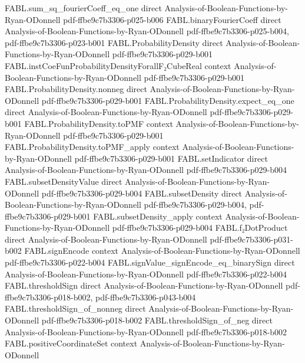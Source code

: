 \begin{theorem}
\proofstep
  {FABL.sum_sq_fourierCoeff_eq_one}
  {direct}
  {Analysis-of-Boolean-Functions-by-Ryan-ODonnell}
  {pdf-ffbe9c7b3306-p025-b006}
\proofstep
  {FABL.binaryFourierCoeff}
  {direct}
  {Analysis-of-Boolean-Functions-by-Ryan-ODonnell}
  {pdf-ffbe9c7b3306-p025-b004,
    pdf-ffbe9c7b3306-p023-b001}
\proofstep
  {FABL.ProbabilityDensity}
  {direct}
  {Analysis-of-Boolean-Functions-by-Ryan-ODonnell}
  {pdf-ffbe9c7b3306-p029-b001}
\proofstep
  {FABL.instCoeFunProbabilityDensityForallF₂CubeReal}
  {context}
  {Analysis-of-Boolean-Functions-by-Ryan-ODonnell}
  {pdf-ffbe9c7b3306-p029-b001}
\proofstep
  {FABL.ProbabilityDensity.nonneg}
  {direct}
  {Analysis-of-Boolean-Functions-by-Ryan-ODonnell}
  {pdf-ffbe9c7b3306-p029-b001}
\proofstep
  {FABL.ProbabilityDensity.expect_eq_one}
  {direct}
  {Analysis-of-Boolean-Functions-by-Ryan-ODonnell}
  {pdf-ffbe9c7b3306-p029-b001}
\proofstep
  {FABL.ProbabilityDensity.toPMF}
  {context}
  {Analysis-of-Boolean-Functions-by-Ryan-ODonnell}
  {pdf-ffbe9c7b3306-p029-b001}
\proofstep
  {FABL.ProbabilityDensity.toPMF_apply}
  {context}
  {Analysis-of-Boolean-Functions-by-Ryan-ODonnell}
  {pdf-ffbe9c7b3306-p029-b001}
\proofstep
  {FABL.setIndicator}
  {direct}
  {Analysis-of-Boolean-Functions-by-Ryan-ODonnell}
  {pdf-ffbe9c7b3306-p029-b004}
\proofstep
  {FABL.subsetDensityValue}
  {direct}
  {Analysis-of-Boolean-Functions-by-Ryan-ODonnell}
  {pdf-ffbe9c7b3306-p029-b004}
\proofstep
  {FABL.subsetDensity}
  {direct}
  {Analysis-of-Boolean-Functions-by-Ryan-ODonnell}
  {pdf-ffbe9c7b3306-p029-b004,
    pdf-ffbe9c7b3306-p029-b001}
\proofstep
  {FABL.subsetDensity_apply}
  {context}
  {Analysis-of-Boolean-Functions-by-Ryan-ODonnell}
  {pdf-ffbe9c7b3306-p029-b004}
\proofstep
  {FABL.f₂DotProduct}
  {direct}
  {Analysis-of-Boolean-Functions-by-Ryan-ODonnell}
  {pdf-ffbe9c7b3306-p031-b002}
\proofstep
  {FABL.signEncode}
  {context}
  {Analysis-of-Boolean-Functions-by-Ryan-ODonnell}
  {pdf-ffbe9c7b3306-p022-b004}
\proofstep
  {FABL.signValue_signEncode_eq_binarySign}
  {direct}
  {Analysis-of-Boolean-Functions-by-Ryan-ODonnell}
  {pdf-ffbe9c7b3306-p022-b004}
\proofstep
  {FABL.thresholdSign}
  {direct}
  {Analysis-of-Boolean-Functions-by-Ryan-ODonnell}
  {pdf-ffbe9c7b3306-p018-b002,
    pdf-ffbe9c7b3306-p043-b004}
\proofstep
  {FABL.thresholdSign_of_nonneg}
  {direct}
  {Analysis-of-Boolean-Functions-by-Ryan-ODonnell}
  {pdf-ffbe9c7b3306-p018-b002}
\proofstep
  {FABL.thresholdSign_of_neg}
  {direct}
  {Analysis-of-Boolean-Functions-by-Ryan-ODonnell}
  {pdf-ffbe9c7b3306-p018-b002}
\proofstep
  {FABL.positiveCoordinateSet}
  {context}
  {Analysis-of-Boolean-Functions-by-Ryan-ODonnell}

\end{theorem}
